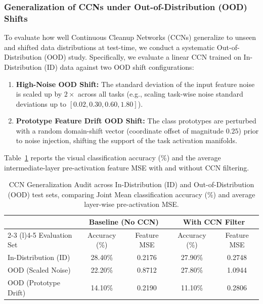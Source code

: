 \subsubsection{Generalization of CCNs under Out-of-Distribution (OOD) Shifts}
\label{subsubsec:ccn_generalization}

To evaluate how well Continuous Cleanup Networks (CCNs) generalize to unseen and shifted data distributions at test-time, we conduct a systematic Out-of-Distribution (OOD) study. Specifically, we evaluate a linear CCN trained on In-Distribution (ID) data against two OOD shift configurations:
\begin{enumerate}
    \item \textbf{High-Noise OOD Shift:} The standard deviation of the input feature noise is scaled up by $2\times$ across all tasks (e.g., scaling task-wise noise standard deviations up to $[0.02, 0.30, 0.60, 1.80]$).
    \item \textbf{Prototype Feature Drift OOD Shift:} The class prototypes are perturbed with a random domain-shift vector (coordinate offset of magnitude $0.25$) prior to noise injection, shifting the support of the task activation manifolds.
\end{enumerate}

Table~\ref{tab:ccn_generalization} reports the visual classification accuracy (\%) and the average intermediate-layer pre-activation feature MSE with and without CCN filtering.

\begin{table}[h]
\caption{CCN Generalization Audit across In-Distribution (ID) and Out-of-Distribution (OOD) test sets, comparing Joint Mean classification accuracy (\%) and average layer-wise pre-activation MSE.}
\label{tab:ccn_generalization}
\vskip 0.15in
\begin{center}
\begin{small}
\begin{sc}
\begin{tabular}{lcccc}
\toprule
 & \multicolumn{2}{c}{Baseline (No CCN)} & \multicolumn{2}{c}{With CCN Filter} \\
\cmidrule(r){2-3} \cmidrule(l){4-5}
Evaluation Set & Accuracy (\%) & Feature MSE & Accuracy (\%) & Feature MSE \\
\midrule
In-Distribution (ID) & 28.40\% & 0.2176 & 27.90\% & 0.2748 \\
OOD (Scaled Noise) & 22.20\% & 0.8712 & 27.80\% & 1.0944 \\
OOD (Prototype Drift) & 14.10\% & 0.2190 & 11.10\% & 0.2806 \\
\bottomrule
\end{tabular}
\end{sc}
\end{small}
\end{center}
\vskip -0.1in
\end{table}

